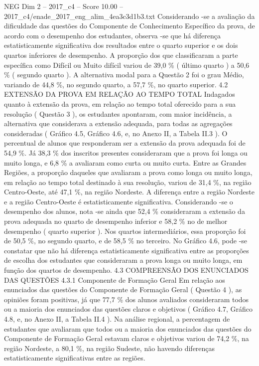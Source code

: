 \begin{textsample}{NEG Dim 2 – 2017\_c4 – Score 10.00 – 2017\_c4/enade\_2017\_eng\_alim\_4ea3c3d1b3.txt}
Considerando -se a avaliação da dificuldade das questões do Componente de Conhecimento Específico da prova, de acordo com o desempenho dos estudantes, observa -se que há diferença estatisticamente significativa dos resultados entre o quarto superior e os dois quartos inferiores de desempenho.
A proporção dos que classificaram a parte específica como Difícil ou Muito difícil variou de 39,0 \% ( último quarto ) a 50,6 \% ( segundo quarto ).
A alternativa modal para a Questão 2 foi o grau Médio, variando de 44,8 \%, no segundo quarto, a 57,7 \%, no quarto superior. 4.2 EXTENSÃO DA PROVA EM RELAÇÃO AO TEMPO TOTAL Indagados quanto à extensão da prova, em relação ao tempo total oferecido para a sua resolução ( Questão 3 ), os estudantes apontaram, com maior incidência, a alternativa que considerava a extensão adequada, para todas as agregações consideradas ( Gráfico 4.5, Gráfico 4.6, e, no Anexo II, a Tabela II.3 ).
O percentual de alunos que responderam ser a extensão da prova adequada foi de 54,9 \%.
Já 38,3 \% dos inscritos presentes consideraram que a prova foi longa ou muito longa, e 6,8 \% a avaliaram como curta ou muito curta.
Entre as Grandes Regiões, a proporção daqueles que avaliaram a prova como longa ou muito longa, em relação ao tempo total destinado à sua resolução, variou de 31,4 \%, na região Centro-Oeste, até 47,1 \%, na região Nordeste.
A diferença entre a região Nordeste e a região Centro-Oeste é estatisticamente significativa.
Considerando -se o desempenho dos alunos, nota -se ainda que 52,4 \% consideraram a extensão da prova adequada no quarto de desempenho inferior e 58,2 \% no de melhor desempenho ( quarto superior ).
Nos quartos intermediários, essa proporção foi de 50,5 \%, no segundo quarto, e de 58,5 \% no terceiro.
No Gráfico 4.6, pode -se constatar que não há diferença estatisticamente significativa entre as proporções de escolha dos estudantes que consideraram a prova longa ou muito longa, em função dos quartos de desempenho. 4.3 COMPREENSÃO DOS ENUNCIADOS DAS QUESTÕES 4.3.1 Componente de Formação Geral Em relação aos enunciados das questões do Componente de Formação Geral ( Questão 4 ), as opiniões foram positivas, já que 77,7 \% dos alunos avaliados consideraram todos ou a maioria dos enunciados das questões claros e objetivos ( Gráfico 4.7, Gráfico 4.8, e, no Anexo II, a Tabela II.4 ).
Na análise regional, a percentagem de estudantes que avaliaram que todos ou a maioria dos enunciados das questões do Componente de Formação Geral estavam claros e objetivos variou de 74,2 \%, na região Nordeste, a 80,1 \%, na região Sudeste, não havendo diferenças estatisticamente significativas entre as regiões.

\end{textsample}
